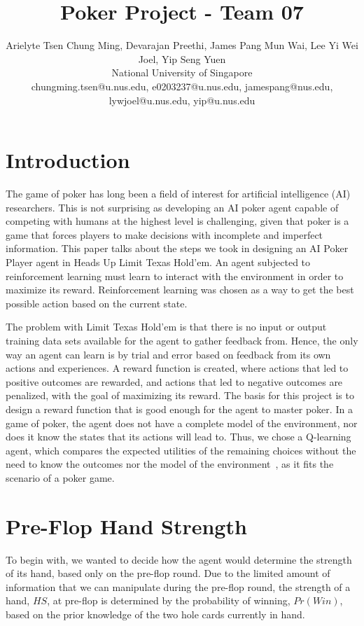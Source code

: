\documentclass{article}
\title{Poker Project - Team 07}
\author{
Arielyte Tsen Chung Ming, Devarajan Preethi, James Pang Mun Wai, Lee Yi Wei Joel, Yip Seng Yuen
\\ 
National University of Singapore\\
%
chungming.tsen@u.nus.edu, e0203237@u.nus.edu, jamespang@nus.edu, lywjoel@u.nus.edu, yip@u.nus.edu
}
\begin{document}
\maketitle

\section{Introduction}

The game of poker has long been a field of interest for artificial intelligence (AI) researchers. This is not surprising as developing an AI poker agent capable of competing with humans at the highest level is challenging, given that poker is a game that forces players to make decisions with incomplete and imperfect information. This paper talks about the steps we took in designing an AI Poker Player agent in Heads Up Limit Texas Hold'em. An agent subjected to reinforcement learning must learn to interact with the environment in order to maximize its reward. Reinforcement learning was chosen as a way to get the best possible action based on the current state.

The problem with Limit Texas Hold'em is that there is no input or output training data sets available for the agent to gather feedback from. Hence, the only way an agent can learn is by trial and error based on feedback from its own actions and experiences. A reward function is created, where actions that led to positive outcomes are rewarded, and actions that led to negative outcomes are penalized, with the goal of maximizing its reward. The basis for this project is to design a reward function that is good enough for the agent to master poker. In a game of poker, the agent does not have a complete model of the environment, nor does it know the states that its actions will lead to. Thus, we chose a Q-learning agent, which compares the expected utilities of the remaining choices without the need to know the outcomes nor the model of the environment~\cite{russell-norvig:Modern}, as it fits the scenario of a poker game.

\section{Pre-Flop Hand Strength}

To begin with, we wanted to decide how the agent would determine the strength of its hand, based only on the pre-flop round. Due to the limited amount of information that we can manipulate during the pre-flop round, the strength of a hand, $HS$, at pre-flop is determined by the probability of winning, $Pr(Win)$, based on the prior knowledge of the two hole cards currently in hand. 
\end{document}
